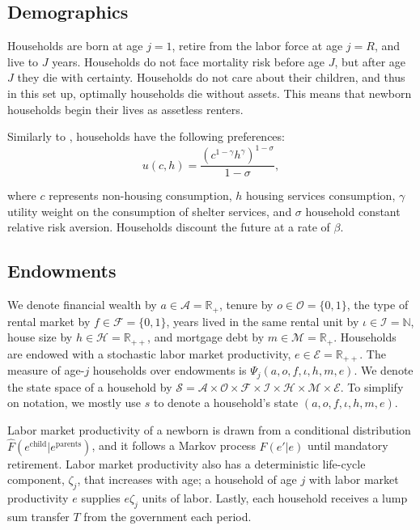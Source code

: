 \documentclass[parskip=full]{article}
\begin{document}
\subsection{Demographics}\label{subsection:demographics}

Households are born at age $j=1$, retire from the labor force at age $j=R$, and live to $J$ years. Households do not face mortality risk before age $J$, but after age $J$ they die with certainty. Households do not care about their children, and thus in this set up, optimally households die without assets. This means that newborn households begin their lives as assetless renters.

Similarly to \citet{sommersullivan-2017}, households have the following preferences:
\begin{equation*}
    u(c,h)=\frac{\left(c^{1-\gamma} h^{\gamma}\right)^{1-\sigma}}{1-\sigma},
\end{equation*}

\noindent where $c$ represents non-housing consumption, $h$ housing services consumption, $\gamma$ utility weight on the consumption of shelter services, and $\sigma$ household constant relative risk aversion. Households discount the future at a rate of $\beta$. %

\subsection{Endowments}

We denote financial wealth by $a\in \mathcal{A}=\mathbb{R}_+$, tenure by $o \in \mathcal{O}=\{0,1\}$, the type of rental market by $f \in \mathcal{F}=\{0,1\}$, years lived in the same rental unit by $\iota \in \mathcal{I}=\mathbb{N}$, house size by $h\in \mathcal{H}=\mathbb{R}_{++}$, and mortgage debt by $m\in \mathcal{M}=\mathbb{R}_+$. Households are endowed with a stochastic labor market productivity, $e \in\mathcal{E} = \mathbb{R}_{++}$. The measure of age-$j$ households over endowments is $\Psi_{j}(a,o,f,\iota,h,m,e)$. We denote the state space of a household by  $\mathcal{S}=\mathcal{A}\times\mathcal{O}\times\mathcal{F}\times\mathcal{I}\times\mathcal{H}\times\mathcal{M}\times\mathcal{E}$. To simplify on notation, we mostly use $s$ to denote a household's state $(a,o,f,\iota,h,m,e)$.

Labor market productivity of a newborn is drawn from a conditional distribution \\ $\hat{F}(e^{\mbox{child}}|e^{\mbox{parents}})$, and it follows a Markov process $F(e'|e)$ until mandatory retirement. Labor market productivity also has a deterministic life-cycle component, $\zeta_j$, that increases with age; a household of age $j$ with labor market productivity $e$ supplies $e\zeta_j$ units of labor. Lastly, each household receives a lump sum transfer $T$ from the government each period.
\end{document}
